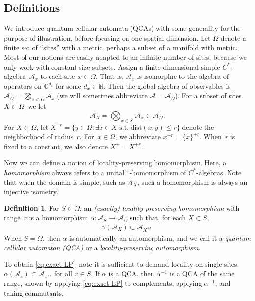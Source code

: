 \documentclass[11pt,reqno]{amsart}
\theoremstyle{definition}
\newtheorem{definition}[theorem]{Definition}
\theoremstyle{remark}
\numberwithin{equation}{section}
\newcommand{\cA}{\mathcal A}
\begin{document}
\subsection{Definitions} \label{sec:QCA-definitions}
We introduce quantum cellular automata (QCAs) with some generality for the purpose of illustration, before focusing on one spatial dimension.
Let $\Omega$ denote a finite set of ``sites'' with a metric, perhaps a subset of a manifold with metric.
Most of our notions are easily adapted to an infinite number of sites, because we only work with constant-size subsets.
Assign a finite-dimensional simple $C^*$-algebra~$\cA_x$ to each site~$x \in \Omega$.
That is, $\cA_x$ is isomorphic to the algebra of operators on $\mathbb{C}^{d_x}$ for some $d_x \in \mathbb{N}$.
Then the global algebra of observables is $\cA_\Omega = \bigotimes_{x \in \Omega} \cA_x$ (we will sometimes abbreviate $\cA=\cA_\Omega$).
For a subset of sites $X \subset \Omega$, we let
\begin{equation*}
    \cA_X = \bigotimes_{x \in X} \cA_x \subset \cA_\Omega.
\end{equation*}
For $X \subset \Omega$, let $X^{+r} = \{ y  \in \Omega : \exists x \in X \text{ s.t.\ } \mathrm{dist}(x,y) \le r \}$ denote the neighborhood of radius~$r$.
For~$x \in \Omega$, we abbreviate $x^{+r} = \{x\}^{+r}$.
When~$r$ is fixed to a constant, we also denote $X^{+} = X^{+r}$.

Now we can define a notion of locality-preserving homomorphism.
Here, a \emph{homomorphism} always refers to a unital $*$-homomorphism of $C^*$-algebras.
Note that when the domain is simple, such as $\cA_X$, such a homomorphism is always an injective isometry.

\begin{definition}\label{def:local-homomorphism}
    For $S \subset \Omega$, an \emph{(exactly) locality-preserving homomorphism} with range~$r$ is a homomorphism $\alpha : \cA_S \to \cA_\Omega$ such that, for each $X \subset S$,
    \begin{align}\label{eq:exact-LP}
        \alpha(\cA_X) \subset \cA_{X^{+r}}.
    \end{align}
    When $S=\Omega$, then $\alpha$ is automatically an automorphism, and we call it a \emph{quantum cellular automaton (QCA)} or a \emph{locality-preserving automorphism}.
\end{definition}
\noindent
To obtain \cref{eq:exact-LP}, note it is sufficient to demand locality on single sites: $\alpha(\cA_x) \subset \cA_{x^{+r}}$ for all $x \in S$.
If $\alpha$ is a QCA, then $\alpha^{-1}$ is a QCA of the same range, shown by applying \cref{eq:exact-LP} to complements, applying $\alpha^{-1}$, and taking commutants.
\end{document}

